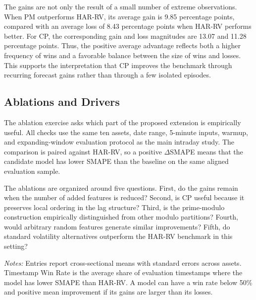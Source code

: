 \documentclass[11pt,a4paper]{article}
\begin{document}
\noindent
The gains are not only the result of a small number of extreme observations. When PM outperforms HAR-RV, its average gain is 9.85 percentage points, compared with an average loss of 8.43 percentage points when HAR-RV performs better. For CP, the corresponding gain and loss magnitudes are 13.07 and 11.28 percentage points. Thus, the positive average advantage reflects both a higher frequency of wins and a favorable balance between the size of wins and losses. This supports the interpretation that CP improves the benchmark through recurring forecast gains rather than through a few isolated episodes.

\subsection{Ablations and Drivers}

\noindent
The ablation exercise asks which part of the proposed extension is empirically useful. All checks use the same ten assets, date range, 5-minute inputs, warmup, and expanding-window evaluation protocol as the main intraday study. The comparison is paired against HAR-RV, so a positive $\Delta$SMAPE means that the candidate model has lower SMAPE than the baseline on the same aligned evaluation sample.

\noindent
The ablations are organized around five questions. First, do the gains remain when the number of added features is reduced? Second, is CP useful because it preserves local ordering in the lag structure? Third, is the prime-modulo construction empirically distinguished from other modulo partitions? Fourth, would arbitrary random features generate similar improvements? Fifth, do standard volatility alternatives outperform the HAR-RV benchmark in this setting?

{\renewcommand{\thetable}{3}
\begin{center}
\label{tab:param_efficiency}
\small
\renewcommand{\arraystretch}{1.12}
\setlength{\tabcolsep}{5pt}
\resizebox{0.98\textwidth}{!}{}

\vspace{0.1cm}
\footnotesize \parbox{0.92\textwidth}{\textit{Notes:} Entries report cross-sectional means with standard errors across assets. Timestamp Win Rate is the average share of evaluation timestamps where the model has lower SMAPE than HAR-RV. A model can have a win rate below 50\% and positive mean improvement if its gains are larger than its losses.}
\end{center}}
\end{document}
